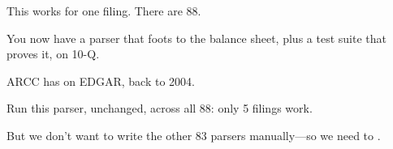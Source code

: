 \begin{frame}{This works for one filing. There are 88.}
\begin{wideitemize}
  \item You now have a parser that foots to the balance sheet, plus a test suite
        that proves it, on  10-Q.
  \item ARCC has  on EDGAR, back to 2004.
  \item Run this parser, unchanged, across all 88: only 5 filings work. 
  \item But we don't want to write the other 83 parsers manually---so we need to .
\end{wideitemize}
\end{frame}
